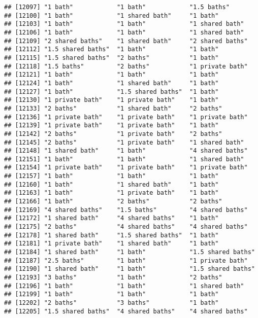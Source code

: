 \documentclass[
]{article}
\begin{document}
\begin{verbatim}
## [12097] "1 bath"            "1 bath"            "1.5 baths"        
## [12100] "1 bath"            "1 shared bath"     "1 bath"           
## [12103] "1 bath"            "1 bath"            "1 shared bath"    
## [12106] "1 bath"            "1 bath"            "1 shared bath"    
## [12109] "2 shared baths"    "1 shared bath"     "2 shared baths"   
## [12112] "1.5 shared baths"  "1 bath"            "1 bath"           
## [12115] "1.5 shared baths"  "2 baths"           "1 bath"           
## [12118] "1.5 baths"         "2 baths"           "1 private bath"   
## [12121] "1 bath"            "1 bath"            "1 bath"           
## [12124] "1 bath"            "1 shared bath"     "1 bath"           
## [12127] "1 bath"            "1.5 shared baths"  "1 bath"           
## [12130] "1 private bath"    "1 private bath"    "1 bath"           
## [12133] "2 baths"           "1 shared bath"     "2 baths"          
## [12136] "1 private bath"    "1 private bath"    "1 private bath"   
## [12139] "1 private bath"    "1 private bath"    "1 bath"           
## [12142] "2 baths"           "1 private bath"    "2 baths"          
## [12145] "2 baths"           "1 private bath"    "1 shared bath"    
## [12148] "1 shared bath"     "1 bath"            "4 shared baths"   
## [12151] "1 bath"            "1 bath"            "1 shared bath"    
## [12154] "1 private bath"    "1 private bath"    "1 private bath"   
## [12157] "1 bath"            "1 bath"            "1 bath"           
## [12160] "1 bath"            "1 shared bath"     "1 bath"           
## [12163] "1 bath"            "1 private bath"    "1 bath"           
## [12166] "1 bath"            "2 baths"           "2 baths"          
## [12169] "4 shared baths"    "1.5 baths"         "4 shared baths"   
## [12172] "1 shared bath"     "4 shared baths"    "1 bath"           
## [12175] "2 baths"           "4 shared baths"    "4 shared baths"   
## [12178] "1 shared bath"     "1.5 shared baths"  "1 bath"           
## [12181] "1 private bath"    "1 shared bath"     "1 bath"           
## [12184] "1 shared bath"     "1 bath"            "1.5 shared baths" 
## [12187] "2.5 baths"         "1 bath"            "1 private bath"   
## [12190] "1 shared bath"     "1 bath"            "1.5 shared baths" 
## [12193] "3 baths"           "1 bath"            "2 baths"          
## [12196] "1 bath"            "1 bath"            "1 shared bath"    
## [12199] "1 bath"            "1 bath"            "1 bath"           
## [12202] "2 baths"           "3 baths"           "1 bath"           
## [12205] "1.5 shared baths"  "4 shared baths"    "4 shared baths"   

\end{verbatim}
\end{document}
